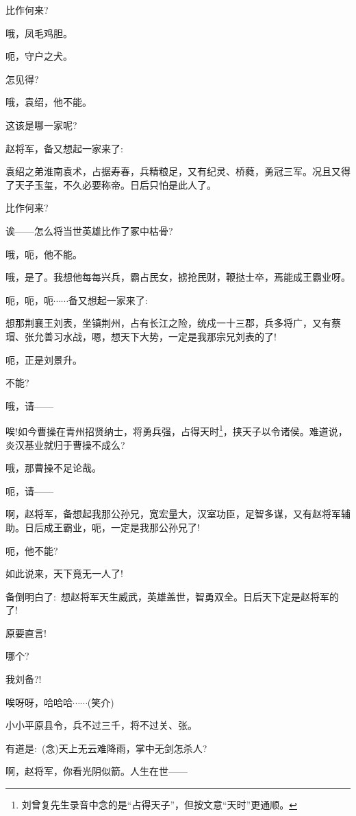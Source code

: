 {{比作何来?}

{哦，凤毛鸡胆。}

{呃，守户之犬。}

{怎见得?}

{哦，袁绍，他不能。}

{这该是哪一家呢?}

{赵将军，备又想起一家来了:~}

{袁绍之弟淮南袁术，占据寿春，兵精粮足，又有纪灵、桥蕤，勇冠三军。况且又得了天子玉玺，不久必要称帝。日后只怕是此人了。}

{比作何来?}

{诶------怎么将当世英雄比作了冢中枯骨?}

{哦，呃，他不能。}

{哦，是了。我想他每每兴兵，霸占民女，掳抢民财，鞭挞士卒，焉能成王霸业呀。}

{呃，呃，呃$\cdots{}\cdots{}$备又想起一家来了:~}

{想那荆襄王刘表，坐镇荆州，占有长江之险，统戍一十三郡，兵多将广，又有蔡瑁、张允善习水战，嗯，想天下大势，一定是我那宗兄刘表的了!}

{呃，正是刘景升。}

{不能?}

{哦，请------}

{唉!如今曹操在青州招贤纳士，将勇兵强，占得天时}\footnote{刘曾复先生录音中念的是``占得天子''，但按文意``天时''更通顺。}{，挟天子以令诸侯。难道说，炎汉基业就归于曹操不成么?}

{哦，那曹操不足论哉。}

{呃，请------}

{啊，赵将军，备想起我那公孙兄，宽宏量大，汉室功臣，足智多谋，又有赵将军辅助。日后成王霸业，呃，一定是我那公孙兄了!}

{呃，他不能?}

{如此说来，天下竟无一人了!}

{备倒明白了:~想赵将军天生威武，英雄盖世，智勇双全。日后天下定是赵将军的了!}

{原要直言!}

{哪个?}

{我刘备?!}

{唉呀呀，哈哈哈$\cdots{}\cdots{}$({\hwfs 笑介})}

{小小平原县令，兵不过三千，将不过关、张。}

{有道是:~({\akai 念})天上无云难降雨，掌中无剑怎杀人?}


{啊，赵将军，你看光阴似箭。人生在世------}

}
